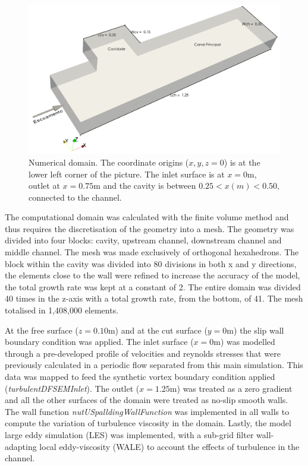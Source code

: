 \begin{figure}[!ht]
\centering
\includegraphics[width=\linewidth]{../images/art3/imgEst1.png}
\caption{Numerical domain. The coordinate origins ($x,y,z=0$) is at the lower left corner of the picture. The inlet surface is at $x=0$m, outlet at $x=0.75$m and the cavity is between $0.25<x (m)<0.50$, connected to the channel.}
\label{fig:art3:compDomain}
\end{figure}

The computational domain was calculated with the finite volume method and thus requires the discretisation of the geometry into a mesh. The geometry was divided into four blocks: cavity, upstream channel, downstream channel and middle channel. The mesh was made exclusively of orthogonal hexahedrons. The block within the cavity was divided into 80 divisions in both x and y directions, the elements close to the wall were refined to increase the accuracy of the model, the total growth rate was kept at a constant of 2. The entire domain was divided 40 times in the z-axis with a total growth rate, from the bottom, of 41. The mesh totalised in 1,408,000 elements.

At the free surface ($z=0.10$m) and at the cut surface ($y=0$m) the slip wall boundary condition was applied. The inlet surface ($x=0$m) was modelled through a pre-developed profile of velocities and reynolds stresses that were previously calculated in a periodic flow separated from this main simulation. This data was mapped to feed the synthetic vortex boundary condition applied (\textit{turbulentDFSEMInlet}). The outlet ($x=1.25$m) was treated as a zero gradient and all the other surfaces of the domain were treated as no-slip smooth walls. The wall function \textit{nutUSpalldingWallFunction} was implemented in all walls to compute the variation of turbulence viscosity in the domain. Lastly, the model large eddy simulation (LES) was implemented, with a sub-grid filter wall-adapting  local eddy-viscosity (WALE) to account the effects of turbulence in the channel.

